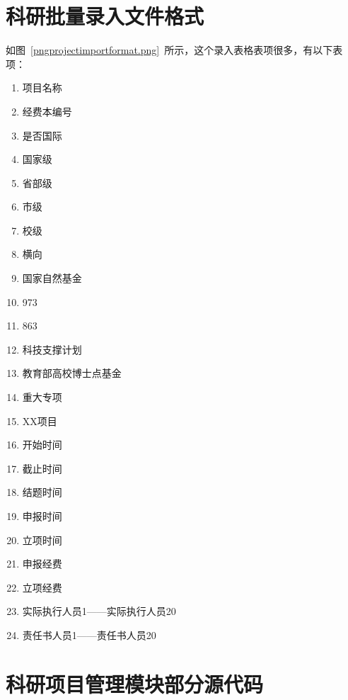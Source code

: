 \chapter{科研批量录入文件格式}
\label{projectimportformat}
如图~\ref{pngprojectimportformat.png}~所示，这个录入表格表项很多，有以下表项：
\begin{enumerate}
\item 项目名称
\item 经费本编号
\item 是否国际
\item 国家级
\item 省部级
\item 市级
\item 校级
\item 横向
\item 国家自然基金
\item 973
\item 863
\item 科技支撑计划
\item 教育部高校博士点基金
\item 重大专项
\item XX项目
\item 开始时间
\item 截止时间
\item 结题时间
\item 申报时间
\item 立项时间
\item 申报经费
\item 立项经费
\item 实际执行人员1——实际执行人员20
\item 责任书人员1——责任书人员20
\end{enumerate}

\chapter{科研项目管理模块部分源代码}
